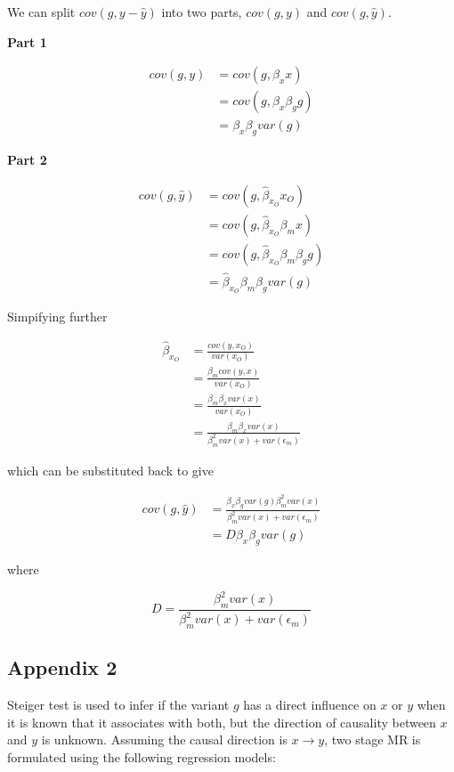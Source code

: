 \documentclass[]{article}
\begin{document}
We can split \(cov(g, y - \hat{y})\) into two parts, \(cov(g, y)\) and
\(cov(g, \hat{y})\).

\textbf{Part 1}

\[
\begin{aligned}
cov(g, y) & = cov(g, \beta_x x) \\
          & = cov(g, \beta_x \beta_g g) \\
          & = \beta_x\beta_g var(g)
\end{aligned}
\]

\textbf{Part 2}

\[
\begin{aligned}
cov(g, \hat{y}) & = cov(g, \hat{\beta}_{x_O} x_O) \\
                & = cov(g, \hat{\beta}_{x_O} \beta_m x) \\
                & = cov(g, \hat{\beta}_{x_O} \beta_m \beta_g g) \\
                & = \hat{\beta}_{x_O} \beta_m \beta_g var(g)
\end{aligned}
\]

Simpifying further

\[
\begin{aligned}
\hat{\beta}_{x_O} & = \frac{cov(y, x_O)} {var(x_O)} \\
                  & = \frac{\beta_m cov(y, x)} {var(x_O)} \\
                  & = \frac{\beta_m \beta_x var(x)} {var(x_O)} \\
                  & = \frac{\beta_m \beta_x var(x)} {\beta_m^2 var(x) + var(\epsilon_m)}
\end{aligned}
\]

which can be substituted back to give

\[
\begin{aligned}
cov(g, \hat{y}) & = \frac{\beta_x\beta_g var(g) \beta_m^2 var(x)} {\beta_m^2 var(x) + var(\epsilon_m)} \\
                & = D\beta_x\beta_g var(g)
\end{aligned}
\]

where

\[
D = \frac{\beta_m^2 var(x)} {\beta_m^2 var(x) + var(\epsilon_m)}
\]

\subsection{Appendix 2}\label{appendix-2}

Steiger test is used to infer if the variant \(g\) has a direct
influence on \(x\) or \(y\) when it is known that it associates with
both, but the direction of causality between \(x\) and \(y\) is unknown.
Assuming the causal direction is \(x \to y\), two stage MR is formulated
using the following regression models:
\end{document}
